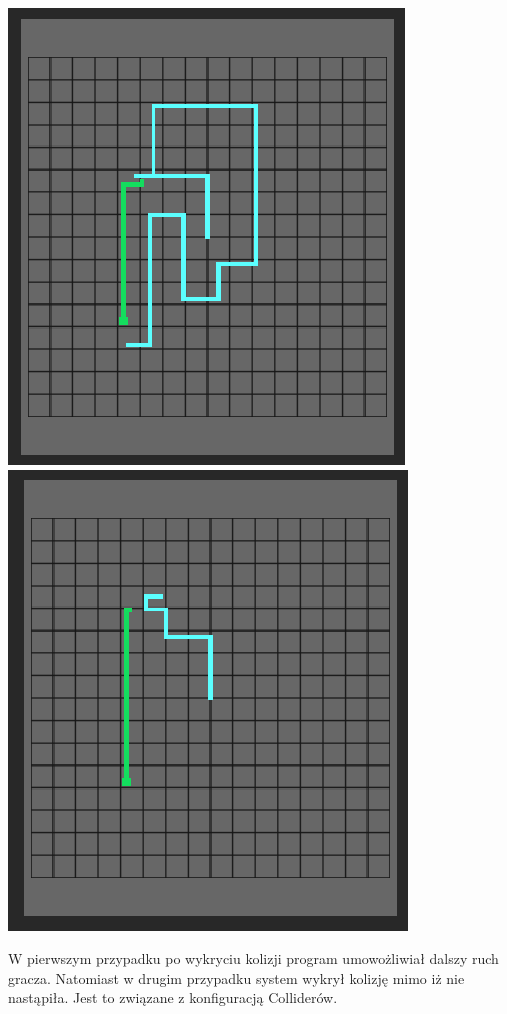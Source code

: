 \documentclass[12pt,a4paper]{article}
\begin{document}
\includegraphics[scale=0.85,keepaspectratio]{test1.png}
\includegraphics[scale=0.85,keepaspectratio]{test2.png}

W pierwszym przypadku po wykryciu kolizji program umowożliwiał dalszy ruch gracza. Natomiast w drugim przypadku system wykrył kolizję mimo iż nie nastąpiła. Jest to związane z konfiguracją Colliderów.
\end{document}
